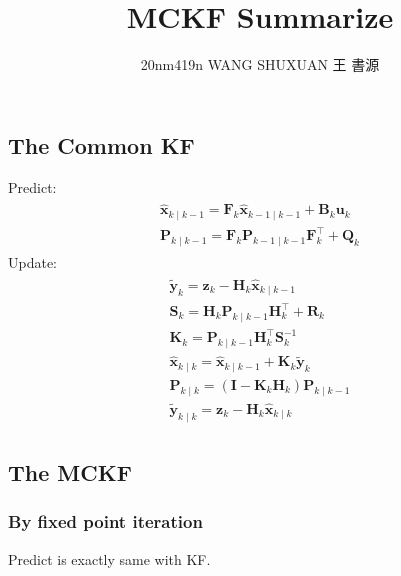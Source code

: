 \documentclass[dvipdfmx]{jsarticle}
\begin{document}
\title{MCKF Summarize}           %
\author{20nm419n   WANG SHUXUAN 王 書源}    %
\maketitle                                  %
\subsection*{The Common KF}
Predict:
\begin{equation}\nonumber\label{Func.}\begin{aligned}
\begin{array}{l}
  \hat{\mathbf{x}}_{k \mid k-1}=\mathbf{F}_{k} \hat{\mathbf{x}}_{k-1 \mid k-1}+\mathbf{B}_{k} \mathbf{u}_{k} \\
  \mathbf{P}_{k \mid k-1}=\mathbf{F}_{k} \mathbf{P}_{k-1 \mid k-1} \mathbf{F}_{k}^{\top}+\mathbf{Q}_{k}
  \end{array}
\end{aligned}\end{equation}
Update:
\begin{equation}\nonumber\label{Func.}\begin{aligned}
  \begin{array}{l}
    \tilde{\mathbf{y}}_{k}=\mathbf{z}_{k}-\mathbf{H}_{k} \hat{\mathbf{x}}_{k \mid k-1} \\
    \mathbf{S}_{k}=\mathbf{H}_{k} \mathbf{P}_{k \mid k-1} \mathbf{H}_{k}^{\top}+\mathbf{R}_{k} \\
    \mathbf{K}_{k}=\mathbf{P}_{k \mid k-1} \mathbf{H}_{k}^{\top} \mathbf{S}_{k}^{-1} \\
    \hat{\mathbf{x}}_{k \mid k}=\hat{\mathbf{x}}_{k \mid k-1}+\mathbf{K}_{k} \tilde{\mathbf{y}}_{k} \\
    \mathbf{P}_{k \mid k}=\left(\mathbf{I}-\mathbf{K}_{k} \mathbf{H}_{k}\right) \mathbf{P}_{k \mid k-1} \\
    \tilde{\mathbf{y}}_{k \mid k}=\mathbf{z}_{k}-\mathbf{H}_{k} \hat{\mathbf{x}}_{k \mid k}
    \end{array}
\end{aligned}\end{equation}
\subsection*{The MCKF}
\subsubsection*{By fixed point iteration}
Predict is exactly same with KF.
\end{document}
